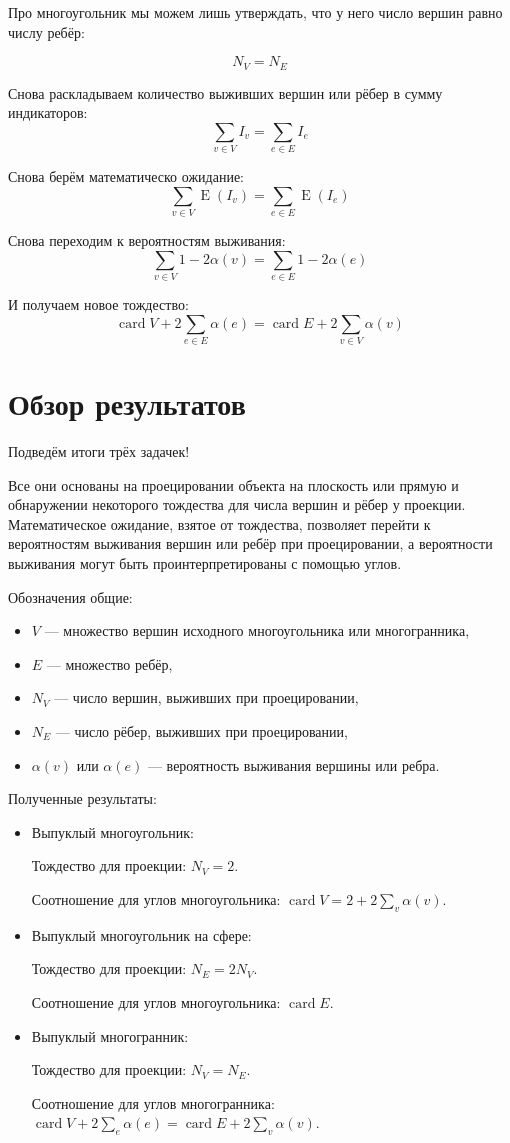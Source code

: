 \documentclass[12pt]{article} %
\theoremstyle{definition} %
\DeclareMathOperator{\E}{E}
\DeclareMathOperator{\card}{card}
\begin{document}

Про многоугольник мы можем лишь утверждать, 
что у него число вершин равно числу ребёр:

\[
N_V = N_E
\]

Снова раскладываем количество выживших вершин или рёбер в сумму индикаторов:
\[
\sum_{v\in V} I_v = \sum_{e\in E} I_e
\]

Снова берём математическо ожидание:
\[
\sum_{v\in V} \E(I_v) = \sum_{e\in E} \E(I_e)
\]

Снова переходим к вероятностям выживания:
\[
\sum_{v\in V} 1 - 2\alpha(v) = \sum_{e\in E} 1 - 2\alpha(e)
\]

И получаем новое тождество:
\[
\card V + 2\sum_{e\in E} \alpha(e) = \card E + 2\sum_{v\in V} \alpha(v)
\]


\section{Обзор результатов}

Подведём итоги трёх задачек! 

Все они основаны на проецировании объекта на плоскость или прямую и обнаружении некоторого тождества для числа вершин и рёбер у проекции.
Математическое ожидание, взятое от тождества, позволяет перейти к вероятностям выживания вершин или ребёр при проецировании,
а вероятности выживания могут быть проинтерпретированы с помощью углов.


Обозначения общие: 

\begin{itemize}
  \item $V$ — множество вершин исходного многоугольника или многогранника, 
  \item $E$ — множество ребёр, 
  \item $N_V$ — число вершин, выживших при проецировании,
  \item $N_E$ — число рёбер, выживших при проецировании,
  \item $\alpha(v)$ или $\alpha(e)$ — вероятность выживания вершины или ребра.
\end{itemize}


Полученные результаты:

\begin{itemize}
\item  Выпуклый многоугольник:

Тождество для проекции: $N_V = 2$.

Соотношение для углов многоугольника: $\card V = 2 + 2\sum_v \alpha(v)$.

\item Выпуклый многоугольник на сфере:

Тождество для проекции: $N_E = 2 N_V$.

Соотношение для углов многоугольника: $\card E $.

\item Выпуклый многогранник:

Тождество для проекции: $N_V = N_E$.

Соотношение для углов многогранника: $\card V + 2\sum_e \alpha(e) = \card E + 2\sum_v \alpha(v)$.
\end{itemize}
\end{document}
